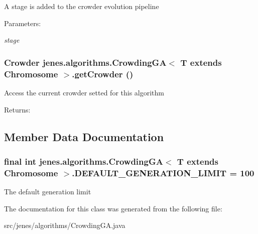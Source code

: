 A stage is added to the crowder evolution pipeline \begin{Desc}
\item[Parameters:]
\begin{description}
\item[{\em stage}]\end{description}
\end{Desc}
\hypertarget{classjenes_1_1algorithms_1_1_crowding_g_a_3_01_t_01extends_01_chromosome_01_4_6cc270cedf906a0743cb743b30c2ba02}{
\subsubsection[getCrowder]{\setlength{\rightskip}{0pt plus 5cm}Crowder jenes.algorithms.CrowdingGA$<$ T extends Chromosome $>$.getCrowder ()}}
\label{classjenes_1_1algorithms_1_1_crowding_g_a_3_01_t_01extends_01_chromosome_01_4_6cc270cedf906a0743cb743b30c2ba02}


Access the current crowder setted for this algorithm \begin{Desc}
\item[Returns:]\end{Desc}


\subsection{Member Data Documentation}
\hypertarget{classjenes_1_1algorithms_1_1_crowding_g_a_3_01_t_01extends_01_chromosome_01_4_fb96c2e73129293b45044998e3614c06}{
\subsubsection[DEFAULT\_\-GENERATION\_\-LIMIT]{\setlength{\rightskip}{0pt plus 5cm}final int jenes.algorithms.CrowdingGA$<$ T extends Chromosome $>$.{\bf DEFAULT\_\-GENERATION\_\-LIMIT} = 100}}
\label{classjenes_1_1algorithms_1_1_crowding_g_a_3_01_t_01extends_01_chromosome_01_4_fb96c2e73129293b45044998e3614c06}


The default generation limit 

The documentation for this class was generated from the following file:\begin{CompactItemize}
\item 
src/jenes/algorithms/CrowdingGA.java\end{CompactItemize}
